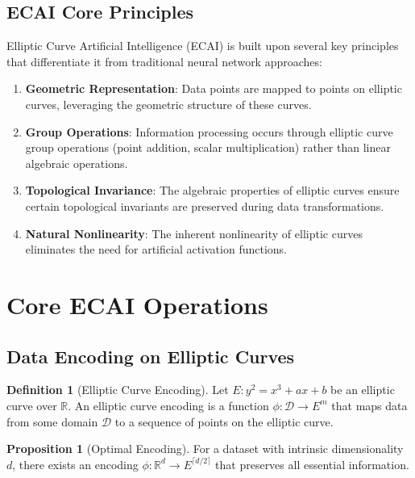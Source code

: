 \documentclass[12pt,a4paper]{article}
\theoremstyle{definition}
\newtheorem{definition}[theorem]{Definition}
\newtheorem{proposition}[theorem]{Proposition}
\begin{document}
\subsection{ECAI Core Principles}

Elliptic Curve Artificial Intelligence (ECAI) is built upon several key principles that differentiate it from traditional neural network approaches:

\begin{enumerate}
\item \textbf{Geometric Representation}: Data points are mapped to points on elliptic curves, leveraging the geometric structure of these curves.
\item \textbf{Group Operations}: Information processing occurs through elliptic curve group operations (point addition, scalar multiplication) rather than linear algebraic operations.
\item \textbf{Topological Invariance}: The algebraic properties of elliptic curves ensure certain topological invariants are preserved during data transformations.
\item \textbf{Natural Nonlinearity}: The inherent nonlinearity of elliptic curves eliminates the need for artificial activation functions.
\end{enumerate}

\section{Core ECAI Operations}

\subsection{Data Encoding on Elliptic Curves}

\begin{definition}[Elliptic Curve Encoding]
Let $E: y^2 = x^3 + ax + b$ be an elliptic curve over $\mathbb{R}$. An elliptic curve encoding is a function $\phi: \mathcal{D} \rightarrow E^m$ that maps data from some domain $\mathcal{D}$ to a sequence of points on the elliptic curve.
\end{definition}

\begin{proposition}[Optimal Encoding]
For a dataset with intrinsic dimensionality $d$, there exists an encoding $\phi: \mathbb{R}^d \rightarrow E^{\lceil d/2 \rceil}$ that preserves all essential information.
\end{proposition}
\end{document}
